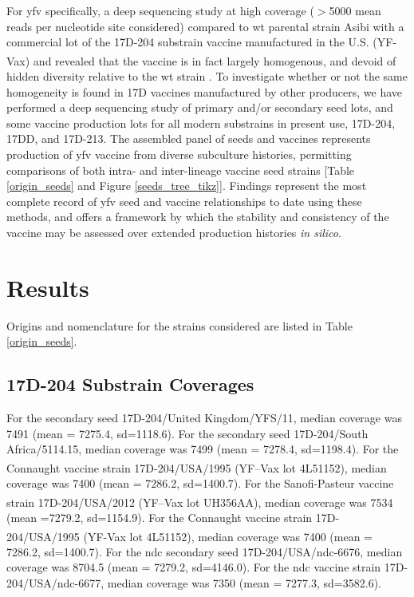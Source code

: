 For \gls{yfv} specifically, a deep sequencing study at high coverage ($>$5000 mean reads per nucleotide site considered) compared to \gls{wt} parental strain Asibi with a commercial lot of the 17D-204 substrain vaccine manufactured in the U.S. (YF-Vax\textsuperscript{\textregistered}) and revealed that the vaccine is in fact largely homogenous, and devoid of hidden diversity relative to the \gls{wt} strain \parencite{Beck:2014cm}. To investigate whether or not the same homogeneity is found in 17D vaccines manufactured by other producers, we have performed a deep sequencing study of primary and/or secondary seed lots, and some vaccine production lots for all modern substrains in present use, 17D-204, 17DD, and 17D-213. The assembled panel of seeds and vaccines represents production of \gls{yfv} vaccine from diverse subculture histories, permitting comparisons of both intra- and inter-lineage vaccine seed strains [Table \ref{origin_seeds} and Figure \ref{seeds_tree_tikz}]. Findings represent the most complete record of \gls{yfv} seed and vaccine relationships to date using these methods, and offers a framework by which the stability and consistency of the vaccine may be assessed over extended production histories \emph{in silico}.

\section{Results}
Origins and nomenclature for the strains considered are listed in Table \ref{origin_seeds}.
\subsection{17D-204 Substrain Coverages}
For the secondary seed 17D-204/United Kingdom/YFS/11, median coverage was 7491 (mean = 7275.4, \gls{sd}=1118.6). For the secondary seed 17D-204/South Africa/5114.15, median coverage was 7499 (mean = 7278.4, \gls{sd}=1198.4). For the Connaught vaccine strain 17D-204/USA/1995 (YF--Vax\textsuperscript{\textregistered} lot 4L51152), median coverage was 7400 (mean = 7286.2, \gls{sd}=1400.7). For the Sanofi-Pasteur vaccine strain 17D-204/USA/2012 (YF--Vax\textsuperscript{\textregistered} lot UH356AA), median coverage was 7534 (mean =7279.2, \gls{sd}=1154.9). For the Connaught vaccine strain 17D-204/USA/1995 (YF-Vax\textsuperscript{\textregistered} lot 4L51152), median coverage was 7400 (mean = 7286.2, \gls{sd}=1400.7). For the \gls{ndc} secondary seed 17D-204/USA/\gls{ndc}-6676, median coverage was 8704.5 (mean = 7279.2, \gls{sd}=4146.0). For the \gls{ndc} vaccine strain 17D-204/USA/\gls{ndc}-6677, median coverage was 7350 (mean = 7277.3, \gls{sd}=3582.6). 
